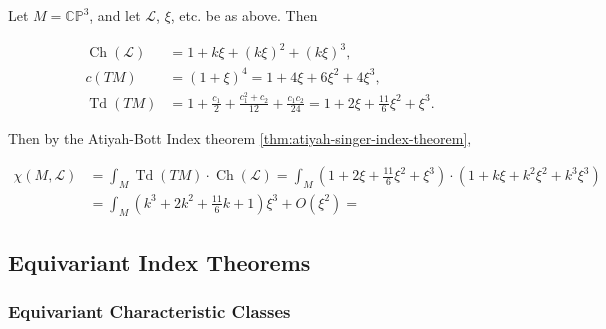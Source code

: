 \documentclass[11pt]{amsart}
\newcommand{\lbracket}{\left(}
\newcommand{\rbracket}{\right)}
\newcommand{\PP}{\mathbb{P}}
\newcommand{\CC}{\mathbb{C}}
\newcommand{\mcL}{\mathcal{L}}
\DeclareMathOperator{\Td}{Td}
\DeclareMathOperator{\Ch}{Ch}
\begin{document}
Let $M = \CC\PP^{3}$, and let $\mcL$, $\xi$, etc. be as above. Then

\begin{equation*}
	\begin{split}
		\Ch(\mcL) &= 1 + k\xi + (k\xi)^{2} + (k\xi)^{3}, \\
		c(TM) &= (1 + \xi)^{4} = 1 + 4\xi + 6\xi^{2} + 4\xi^{3}, \\
		\Td(TM) &= 1 + \frac{c_{1}}{2} + \frac{c_{1}^{2} + c_{2}}{12} + \frac{c_{1}c_{2}}{24} = 1 + 2\xi + \frac{11}{6}\xi^{2} + \xi^{3}.
	\end{split}
\end{equation*}

Then by the Atiyah-Bott Index theorem \ref{thm:atiyah-singer-index-theorem},

\begin{equation*}
	\begin{split}
		\chi(M, \mcL) &= \int_{M} \Td(TM) \cdot \Ch(\mcL) = \int_{M} \lbracket 1 + 2\xi + \frac{11}{6}\xi^{2} + \xi^{3} \rbracket \cdot \lbracket 1 + k\xi + k^{2}\xi^{2} + k^{3}\xi^{3} \rbracket \\
		&= \int_{M} \lbracket k^{3} + 2k^{2} + \frac{11}{6}k + 1 \rbracket\xi^{3} + O(\xi^{2}) = 
	\end{split}
\end{equation*}

\subsection{Equivariant Index Theorems}

\subsubsection{Equivariant Characteristic Classes}




























\providecommand{\bysame}{\leavevmode\hbox to3em{\hrulefill}\thinspace}
\providecommand{\href}[2]{#2}



\end{document}
